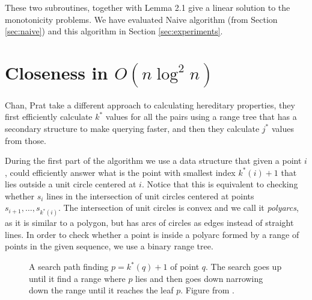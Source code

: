 \documentclass{article}
\begin{document}
These two subroutines, together with Lemma 2.1 give a linear solution
to the monotonicity problems. We have evaluated Naive algorithm
(from Section \ref{sec:naive}) and this algorithm in Section
\ref{sec:experiments}.



\section{Closeness in $O(n \log^2 n)$}
\label{sec:closeness}

Chan, Prat \cite{chan2016} take a different approach to calculating
hereditary properties, they first efficiently calculate $k^*$ values
for all the pairs using a range tree \cite{lueker1978data} that has a secondary structure
to make querying faster, and then they calculate $j^*$ values from
those.

During the first part of the algorithm we use a data structure
that given a point $i$, could efficiently answer what is the point
with smallest index $k^*(i)+1$ that lies outside a unit circle
centered at $i$. Notice that this is equivalent to checking whether $s_i$ lines in the intersection of unit circles centered at points $s_{i+1}, \dots, s_{k^*(i)}$. The intersection of unit circles is convex and we call it \textit{polyarcs}, as it is similar to a polygon, but has arcs of circles as edges instead of straight lines.
In order to check whether a point is inside a polyarc formed by a range of points in the given sequence, we use a binary range tree.

\begin{figure}[h]
    \centering
    \label{fig:query_path}
    \caption{A search path finding $p = k^*(q) + 1$ of point $q$.
    The search goes up until it find a range where $p$ lies and
    then goes down narrowing down the range until it reaches the
    leaf $p$.
    Figure from \cite{chan2016}.}
\end{figure}
\end{document}
